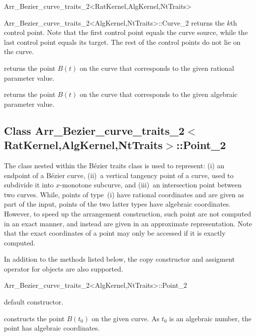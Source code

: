 \begin{ccRefClass}{Arr_Bezier_curve_traits_2<RatKernel,AlgKernel,NtTraits>}
\begin{ccClass}{Arr_Bezier_curve_traits_2<AlgKernel,NtTraits>::Curve_2}
  {returns the $k$th control point. Note that the first control point equals
   the curve source, while the last control point equals its target. The rest
   of the control points do not lie on the curve.
   }

  {returns the point $B(t)$ on the curve that corresponds to the given
   rational parameter value.}

  {returns the point $B(t)$ on the curve that corresponds to the given
   algebraic parameter value.}

\end{ccClass}


\subsection*{Class
         Arr\_Bezier\_curve\_traits\_2$<$RatKernel,AlgKernel,NtTraits$>$::Point\_2}

The  class nested within the B\'ezier traits class is used
to represent: (i) an endpoint of a B\'ezier curve, (ii)~a vertical tangency
point of a curve, used to subdivide it into $x$-monotone subcurve, and
(iii)~an intersection point between two curves. While, points of type~(i) have
rational coordinates and are given as part of the input, points of the two
latter types have algebraic coordinates. However, to speed up the arrangement
construction, such point are not computed in an exact manner, and instead
are given in an approximate representation. Note that the exact coordinates
of a point may only be accessed if it is exactly computed.

In addition to the methods listed below, the copy constructor and assigment
operator for  objects are also supported.

\begin{ccClass}{Arr_Bezier_curve_traits_2<AlgKernel,NtTraits>::Point_2}

\ccCreation
{}

  {default constructor.}

  {constructs the point $B(t_0)$ on the given curve. As $t_0$ is an
   algebraic number, the point has algebraic coordinates.}


\end{ccClass}
\end{ccRefClass}

